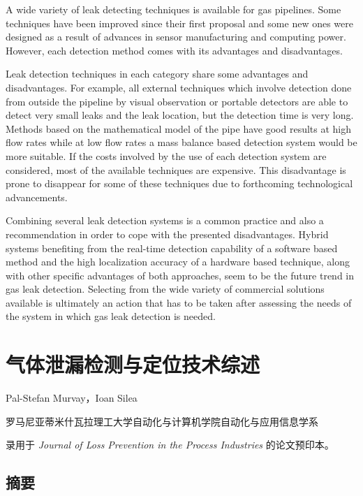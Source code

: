 A wide variety of leak detecting techniques is available for gas pipelines. Some techniques have been improved since their first proposal and some new ones were designed as a result of advances in sensor manufacturing and computing power. However, each detection method comes with its advantages and disadvantages.

Leak detection techniques in each category share some advantages and disadvantages. For example, all external techniques which involve detection done from outside the pipeline by visual observation or portable detectors are able to detect very small leaks and the leak location, but the detection time is very long. Methods based on the mathematical model of the pipe have good results at high flow rates while at low flow rates a mass balance based detection system would be more suitable. If the costs involved by the use of each detection system are considered, most of the available techniques are expensive. This disadvantage is prone to disappear for some of these techniques due to forthcoming technological advancements.

Combining several leak detection systems is a common practice and also a recommendation in order to cope with the presented disadvantages. Hybrid systems benefiting from the real-time detection capability of a software based method and the high localization accuracy of a hardware based technique, along with other specific advantages of both approaches, seem to be the future trend in gas leak detection. Selecting from the wide variety of commercial solutions available is ultimately an action that has to be taken after assessing the needs of the system in which gas leak detection is needed.

\clearpage

\chapter*{气体泄漏检测与定位技术综述}

\noindent Pal-Stefan Murvay，Ioan Silea

\noindent 罗马尼亚蒂米什瓦拉理工大学自动化与计算机学院自动化与应用信息学系

\noindent 录用于 \textit{Journal of Loss Prevention in the Process Industries} 的论文预印本。

\section*{摘要}

